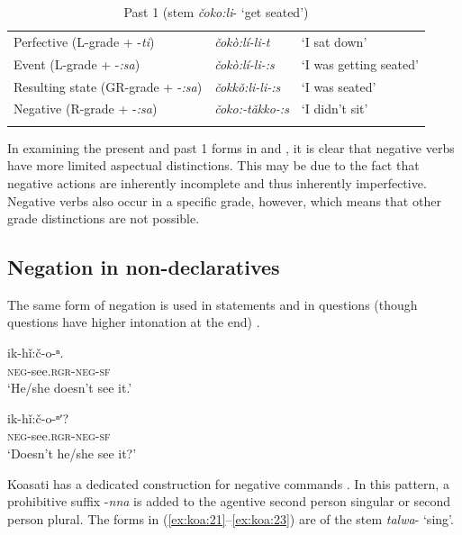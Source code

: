 \documentclass[output=paper,colorlinks,citecolor=brown]{langscibook}
\begin{document}
\begin{table}
    \centering
    \begin{tabular}{lll} 
\lsptoprule
       Perfective (L-grade + -\textit{ti}) & \textit{čokò:lí-li-t} & ‘I sat down’ \\
        Event (L-grade + -\textit{:sa}) & \textit{čokò:lí-li-:s} & ‘I was getting seated’ \\
        Resulting state (GR-grade + -\textit{:sa}) & \textit{čokkǒ:li-li-:s} & ‘I was seated’ \\
        Negative (R-grade + -\textit{:sa}) & \textit{čoko:-tǎkko-:s} & ‘I didn’t sit’ \\
\lspbottomrule
    \end{tabular}
    \caption{Past 1 (stem \textit{čoko:li}- ‘get seated’)}
    \label{tab:koa:3}
\end{table}


In examining the present and past 1 forms in  and , it is clear that negative verbs have more limited aspectual distinctions. This may be due to the fact that negative actions are inherently incomplete and thus inherently imperfective. Negative verbs also occur in a specific grade, however, which means that other grade distinctions are not possible.


\subsection{Negation in non-declaratives}\label{sec:koa:2.2}
The same form of negation is used in statements and in questions (though questions have higher intonation at the end) .


\ea\label{ex:koa:20}
    \ea\label{ex:koa:20a}
        \gll ik-hǐ:č-o-ⁿ.\\ 
             \textsc{neg}-see.\textsc{rgr}-\textsc{neg}-\textsc{sf} \\
        \glt ‘He/she doesn’t see it.’
    
    \ex\label{ex:koa:20b}
        \gll ik-hǐ:č-o-ⁿʹ? \\
             \textsc{neg}-see.\textsc{rgr}-\textsc{neg}-\textsc{sf} \\
        \glt ‘Doesn’t he/she see it?’
    \z
\z 

Koasati has a dedicated construction for negative commands \citep[263]{Kimball1991}. In this pattern, a prohibitive suffix -\textit{nna} is added to the agentive second person singular or second person plural. The forms in (\ref{ex:koa:21}--\ref{ex:koa:23}) are of the stem \textit{talwa}- ‘sing’.
\end{document}
